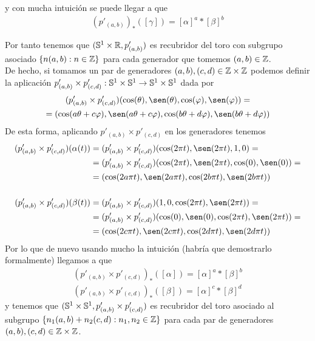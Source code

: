\begin{ejemplo}
\begin{enumerate}
        y con mucha intuición se puede llegar a que 
        \begin{gather*}
            (p'_{(a,b)})_*([\gamma]) = [\alpha]^a \ast [\beta]^b
        \end{gather*}

        Por tanto tenemos que $(\mathbb{S}^1 \times \mathbb{R}, p'_{(a,b)})$ es recubridor del toro con subgrupo asociado $\{n(a,b) : n\in \mathbb{Z}\}$ para cada generador que tomemos $(a,b)\in \mathbb{Z}$.\\

        De hecho, si tomamos un par de generadores $(a,b), (c,d)\in \mathbb{Z}\times \mathbb{Z}$ podemos definir la aplicación $p'_{(a,b)}\times p'_{(c,d)}: \mathbb{S}^1 \times \mathbb{S}^1 \to \mathbb{S}^1 \times \mathbb{S}^1$ dada por 
        \begin{gather*}
            (p'_{(a,b)}\times p'_{(c,d)})(\cos(\theta), \sen(\theta), \cos(\varphi), \sen(\varphi)) =\\
            = (\cos(a\theta + c\varphi), \sen(a\theta + c\varphi), \cos(b\theta + d\varphi), \sen(b\theta + d\varphi))
        \end{gather*}
        De esta forma, aplicando $p'_{(a,b)}\times p'_{(c,d)}$ en los generadores tenemos
        \begin{align*}
            (p'_{(a,b)}\times p'_{(c,d)})(\alpha(t)) &= (p'_{(a,b)}\times p'_{(c,d)})(\cos(2\pi t), \sen(2\pi t), 1, 0) =\\
            &= (p'_{(a,b)}\times p'_{(c,d)})(\cos(2\pi t), \sen(2\pi t), \cos(0), \sen(0)) =\\
            &= (\cos(2a\pi t), \sen(2a\pi t), \cos(2b\pi t), \sen(2b\pi t))\\\\
            (p'_{(a,b)}\times p'_{(c,d)})(\beta(t)) &= (p'_{(a,b)}\times p'_{(c,d)})(1, 0, \cos(2\pi t), \sen(2\pi t)) =\\
            &= (p'_{(a,b)}\times p'_{(c,d)})(\cos(0), \sen(0), \cos(2\pi t), \sen(2\pi t)) =\\
            &= (\cos(2c\pi t), \sen(2c\pi t), \cos(2d\pi t), \sen(2d\pi t))
        \end{align*}
        Por lo que de nuevo usando mucho la intuición (habría que demostrarlo formalmente) llegamos a que
        \begin{gather*}
            (p'_{(a,b)}\times p'_{(c,d)})_*([\alpha]) = [\alpha]^a \ast [\beta]^b\\
            (p'_{(a,b)}\times p'_{(c,d)})_*([\beta]) = [\alpha]^c \ast [\beta]^d
        \end{gather*}
        y tenemos que $(\mathbb{S}^1 \times \mathbb{S}^1, p'_{(a,b)}\times p'_{(c,d)})$ es recubridor del toro asociado al subgrupo $\{n_1(a,b) + n_2(c,d) : n_1,n_2\in \mathbb{Z}\}$ para cada par de generadores $(a,b),(c,d)\in \mathbb{Z}\times \mathbb{Z}$.\\


\end{enumerate}
\end{ejemplo}
